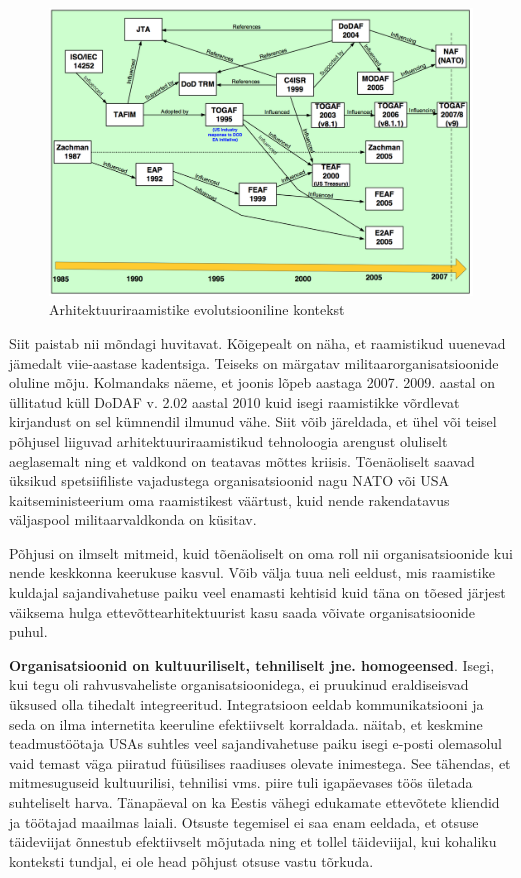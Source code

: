 \documentclass{tufte-book}
\begin{document}
\begin{figure}%
	\begin{center}
		\includegraphics[width=\linewidth]{eaevolution.png}
		\caption{Arhitektuuriraamistike evolutsiooniline kontekst}
		\label{fig:architecture:EA}
	\end{center}
\end{figure}

Siit paistab nii mõndagi huvitavat. Kõigepealt on näha, et raamistikud uuenevad jämedalt viie-aastase kadentsiga. Teiseks on märgatav militaarorganisatsioonide oluline mõju. Kolmandaks näeme, et joonis lõpeb aastaga 2007. 2009. aastal on üllitatud küll DoDAF v. 2.02 aastal 2010 kuid isegi raamistikke võrdlevat kirjandust on sel kümnendil ilmunud vähe. Siit võib järeldada, et ühel või teisel põhjusel liiguvad arhitektuuriraamistikud tehnoloogia arengust oluliselt aeglasemalt ning et valdkond on teatavas mõttes kriisis. Tõenäoliselt saavad üksikud spetsiifiliste vajadustega organisatsioonid nagu NATO või USA kaitseministeerium oma raamistikest väärtust, kuid nende rakendatavus väljaspool militaarvaldkonda on küsitav. 

Põhjusi on ilmselt mitmeid, kuid tõenäoliselt on oma roll nii organisatsioonide kui nende keskkonna keerukuse kasvul. Võib välja tuua neli eeldust, mis raamistike kuldajal sajandivahetuse paiku veel enamasti kehtisid kuid täna on tõesed järjest väiksema hulga ettevõttearhitektuurist kasu saada võivate organisatsioonide puhul.

\textbf{Organisatsioonid on kultuuriliselt, tehniliselt jne. homogeensed}. Isegi, kui tegu oli rahvusvaheliste organisatsioonidega, ei pruukinud eraldiseisvad üksused olla tihedalt integreeritud. Integratsioon eeldab kommunikatsiooni ja seda on ilma internetita keeruline efektiivselt korraldada. \citeauthor{cfmcommnetworks}\cite{cfmcommnetworks} näitab, et keskmine teadmustöötaja USAs suhtles veel sajandivahetuse paiku isegi e-posti olemasolul vaid temast väga piiratud füüsilises raadiuses olevate inimestega. See tähendas, et mitmesuguseid kultuurilisi, tehnilisi vms. piire tuli igapäevases töös ületada suhteliselt harva. Tänapäeval on ka Eestis vähegi edukamate ettevõtete kliendid ja töötajad maailmas laiali. Otsuste tegemisel ei saa enam eeldada, et otsuse täideviijat õnnestub efektiivselt mõjutada ning et tollel täideviijal, kui kohaliku konteksti tundjal, ei ole head põhjust otsuse vastu tõrkuda. 
\end{document}
